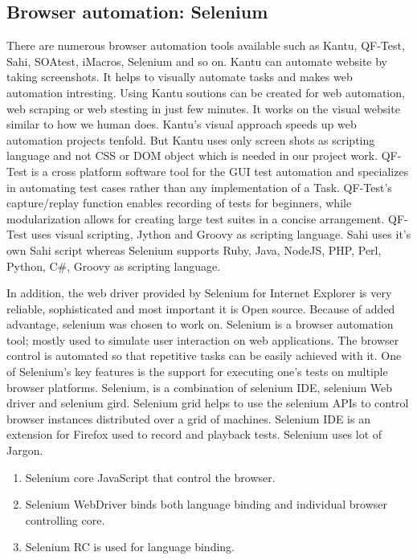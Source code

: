 \documentclass[article,type=msc,colorback,accentcolor=tud9c,twoside,11pt]{tudthesis}
\begin{document}
\subsection{Browser automation: Selenium}
There are numerous browser automation tools available such as Kantu, QF-Test, Sahi, SOAtest, iMacros, Selenium and so on. Kantu can automate website by taking screenshots. It helps to visually automate tasks and makes web automation intresting. Using Kantu soutions can be created for web automation, web scraping or web stesting in just few minutes. It works on the visual website similar to how we human does. Kantu's visual approach speeds up web automation projects tenfold. But
 Kantu uses only screen shots as scripting language and not CSS or DOM object which is needed in our project work. QF-Test is a cross platform software tool for the GUI test automation and specializes in automating test cases rather than any implementation of a Task. QF-Test's capture/replay function enables recording of tests for beginners, while modularization allows for creating large test suites in a concise arrangement.  QF-Test uses visual scripting, Jython and Groovy as scripting language. Sahi uses it's own Sahi script whereas Selenium supports Ruby, Java, NodeJS, PHP, Perl, Python, C\#, Groovy as scripting language. 
 
In addition, the web driver provided by Selenium for Internet Explorer is very reliable, sophisticated and most important it is Open source. Because of added advantage, selenium was chosen to work on.
Selenium\cite{AutomationTestingAnIntroductiontoSelenium} is a browser automation tool; mostly used to simulate user interaction on web applications. The browser control is automated so that repetitive tasks can be easily achieved with it. One of Selenium's key features is the support for executing one's tests on multiple browser platforms. Selenium,  is a combination of selenium IDE, selenium Web driver and selenium gird. Selenium grid helps to use the selenium APIs to control browser instances distributed over a grid of machines. Selenium IDE is an extension for Firefox used to record and playback tests. Selenium uses lot of Jargon.

\begin{enumerate}
\item Selenium core JavaScript that control the browser.
\item Selenium WebDriver binds both language binding and individual browser controlling core.
\item Selenium RC is used for language binding.
\end{enumerate}
\end{document}
